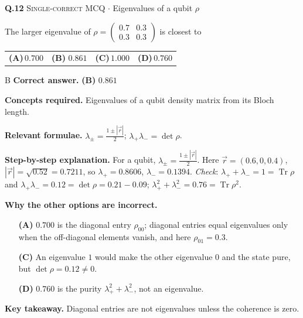 \documentclass[11pt,a4paper]{article}
\newcommand{\optlabel}[1]{\textbf{(#1)}}
\newcommand{\correctlabel}[1]{\textcolor{okgreen}{\textbf{(#1)}\,\ding{51}}}
\newenvironment{qitem}[1]{\begin{list}{}{\setlength{\leftmargin}{3.3em}\setlength{\labelwidth}{3.1em}%
  \setlength{\labelsep}{0.2em}\setlength{\topsep}{3pt}\setlength{\parsep}{3pt}}\item[\textbf{Q.#1}\hfill]}{\end{list}}
\newcommand{\qsep}{\par\vspace{2pt}{\color{black!15}\hrule}\vspace{4pt}}
\newcommand{\qmeta}[2]{{\footnotesize\color{black!60}\textsc{#1} \;$\cdot$\; #2}\par}
\begin{document}
\begin{qitem}{12}
\qmeta{Single-correct MCQ}{Eigenvalues of a qubit $\rho$}
The larger eigenvalue of $\rho = \begin{pmatrix}0.7 & 0.3\\ 0.3 & 0.3\end{pmatrix}$ is closest to
\par\smallskip\noindent\begin{tabularx}{\linewidth}{@{}*{4}{L}@{}}
\optlabel{A}\,$0.700$ & \correctlabel{B}\,$0.861$ & \optlabel{C}\,$1.000$ & \optlabel{D}\,$0.760$
\end{tabularx}
\end{qitem}
\begin{solbox}{B}
\textbf{\color{brand}Correct answer.} \textcolor{okgreen}{\textbf{(B)}} $0.861$

\textbf{\color{brand}Concepts required.} Eigenvalues of a qubit density matrix from its Bloch length.

\textbf{\color{brand}Relevant formulae.} $\lambda_\pm = \frac{1 \pm |\vec r|}{2}$; $\lambda_+\lambda_- = \det\rho$.

\textbf{\color{brand}Step-by-step explanation.} For a qubit, $\lambda_\pm = \frac{1 \pm |\vec r|}{2}$. Here $\vec r = (0.6, 0, 0.4)$, $|\vec r| = \sqrt{0.52} = 0.7211$, so
$\lambda_+ = 0.8606$, $\lambda_- = 0.1394$. \emph{Check}: $\lambda_+ + \lambda_- = 1 = \operatorname{Tr}\rho$ and $\lambda_+\lambda_- = 0.12 = \det\rho = 0.21 - 0.09$;
$\lambda_+^2 + \lambda_-^2 = 0.76 = \operatorname{Tr}\rho^2$.

\textbf{\color{brand}Why the other options are incorrect.}
\begin{itemize}[leftmargin=2.4em, itemsep=1pt, topsep=2pt]
\item[\textbf{(A)}] $0.700$ is the diagonal entry $\rho_{00}$; diagonal entries equal eigenvalues only when the off-diagonal elements vanish, and here $\rho_{01} = 0.3$.
\item[\textbf{(C)}] An eigenvalue $1$ would make the other eigenvalue $0$ and the state pure, but $\det\rho = 0.12 \neq 0$.
\item[\textbf{(D)}] $0.760$ is the purity $\lambda_+^2 + \lambda_-^2$, not an eigenvalue.
\end{itemize}
\textbf{\color{brand}Key takeaway.} Diagonal entries are not eigenvalues unless the coherence is zero.
\end{solbox}
\qsep
\end{document}
